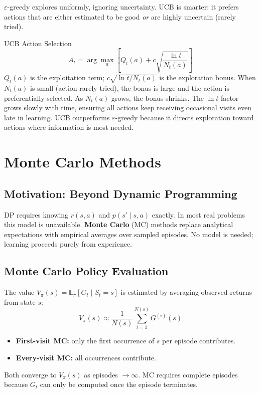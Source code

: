 \documentclass[11pt,a4paper]{article}
\newcommand{\E}{\mathbb{E}}
\newcommand{\term}[1]{\textcolor{DefGreen}{\textbf{#1}}}
\begin{document}
$\varepsilon$-greedy explores uniformly, ignoring uncertainty. UCB is smarter: it prefers actions that are either estimated to be good \emph{or} are highly uncertain (rarely tried).

\begin{defbox}{UCB Action Selection}
\[
A_t = \arg\max_a \left[ Q_t(a) + c\sqrt{\frac{\ln t}{N_t(a)}} \right]
\]
$Q_t(a)$ is the exploitation term; $c\sqrt{\ln t / N_t(a)}$ is the exploration bonus. When $N_t(a)$ is small (action rarely tried), the bonus is large and the action is preferentially selected. As $N_t(a)$ grows, the bonus shrinks. The $\ln t$ factor grows slowly with time, ensuring all actions keep receiving occasional visits even late in learning. UCB outperforms $\varepsilon$-greedy because it directs exploration toward actions where information is most needed.
\end{defbox}

\section{Monte Carlo Methods}

\subsection{Motivation: Beyond Dynamic Programming}

DP requires knowing $r(s,a)$ and $p(s'\mid s,a)$ exactly. In most real problems this model is unavailable. \term{Monte Carlo} (MC) methods replace analytical expectations with empirical averages over sampled episodes. No model is needed; learning proceeds purely from experience.

\subsection{Monte Carlo Policy Evaluation}

The value $V_\pi(s) = \E_\pi[G_t \mid S_t=s]$ is estimated by averaging observed returns from state $s$:
\[
V_\pi(s) \approx \frac{1}{N(s)} \sum_{i=1}^{N(s)} G^{(i)}(s)
\]
\begin{itemize}
  \item \textbf{First-visit MC:} only the first occurrence of $s$ per episode contributes.
  \item \textbf{Every-visit MC:} all occurrences contribute.
\end{itemize}
Both converge to $V_\pi(s)$ as episodes $\to\infty$. MC requires complete episodes because $G_t$ can only be computed once the episode terminates.
\end{document}
